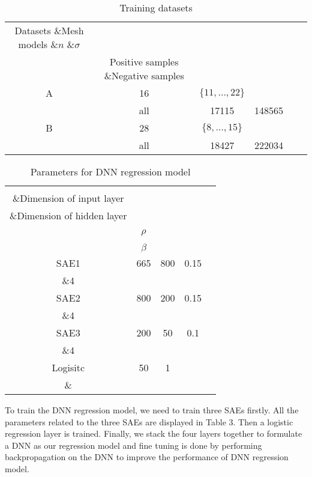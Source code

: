 \documentclass[runningheads]{article}
\begin{document}
\begin{table}[tbp]  
	\centering
	\renewcommand\arraystretch{1.2}
	\caption{Training datasets}
	\begin{tabular}{cccccc}  %
		\hline
		\cline{1-6}
		Datasets \&Mesh models \&\emph{$n$} \&\emph{$\sigma$} \\ &Positive samples \&Negative samples \\ \hline  %
		A &16 &\emph{$\{11,...,22\}$} \\ &all &17115 &148565\\        
		B &28 &\emph{$\{8,...,15\}$} \\&all &18427 &222034\\        
		\hline
		\cline{1-6}
	\end{tabular}
\end{table}
\begin{table}[tbp]  
	\centering
	\renewcommand\arraystretch{1.2}
	\caption{Parameters for DNN regression model}
	\begin{tabular}{ccccc}  %
		\hline
		\cline{1-5}
		\\\&Dimension of input layer \\\&Dimension of hidden layer \\\\&\emph{$\rho$} \\\\ &\emph{$\beta$} \\ \hline  %
		SAE1 &665 &800 &0.15 \\\&4 \\               
		SAE2 &800 &200 &0.15 \\\&4 \\               
		SAE3 &200 &50 &0.1 \\\&4 \\               
		Logisitc &50 &1 & \\\& \\    
		\hline
		\cline{1-5}
	\end{tabular}
\end{table}

To train the DNN regression model, we need to train three SAEs firstly. All the parameters related to the three SAEs are displayed in Table 3. Then a logistic regression layer is trained. Finally, we stack the four layers together to formulate a DNN as our regression model and fine tuning is done by performing backpropagation on the DNN to improve the performance of DNN regression model.
\end{document}
